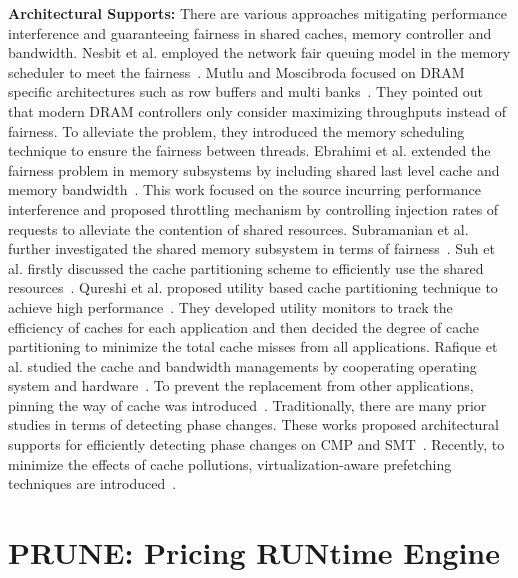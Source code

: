 \documentclass{sig-alternate}
\begin{document}
{\bf Architectural Supports: } 
There are various approaches mitigating performance interference and guaranteeing fairness in shared caches, memory controller and bandwidth. 
Nesbit et al. employed the network fair queuing model in the memory scheduler to meet the fairness~\cite{Nesbit:2006:FQM}. Mutlu and Moscibroda focused on DRAM specific architectures such as row buffers and multi banks~\cite{stfm}. They pointed out that modern DRAM controllers only consider maximizing throughputs instead of fairness. To alleviate the problem, they introduced the memory scheduling technique to ensure the fairness between threads. Ebrahimi et al. extended the fairness problem in memory subsystems by including shared last level cache and memory bandwidth~\cite{fst}. This work focused on the source incurring performance interference and proposed throttling mechanism by controlling injection rates of requests to alleviate the contention of shared resources. Subramanian et al. further investigated the shared memory subsystem in terms of fairness~\cite{6522356}.
Suh et al. firstly discussed the cache partitioning scheme to efficiently use the shared resources~\cite{Suh:2002:NMM:874076.876484}. Qureshi et al. proposed utility based cache partitioning technique to achieve high performance~\cite{Qureshi:2006:UCP:1194816.1194855}. They developed utility monitors to track the efficiency of caches for each application and then decided the degree of cache partitioning to minimize the total cache misses from all applications. Rafique et al. studied the cache and bandwidth managements by cooperating operating system and hardware~\cite{Rafique:2006:ASO:1152154.1152160,Rafique:2007:EMD:1299042.1299052 }. To prevent the replacement from other applications, pinning the way of cache was introduced~\cite{Srikantaiah:2008:ASP:1346281.1346299}. 
Traditionally, there are many prior studies in terms of detecting phase changes.  These works proposed architectural supports for efficiently detecting phase changes on CMP and SMT~\cite{Dhodapkar:2003:CPP:956417.956539, Luque:2009:CAC:1591872.1591935, Luque:2009:IIC:1636712.1637756, 5989796, Luque:2013:FCT:2400682.2400709, Sherwood:2003:PTP:859618.859657, Lau:2005:TPC:1042442.1043427, Eyerman:2009:PCA:1508244.1508260}. 
Recently, to minimize the effects of cache pollutions, virtualization-aware prefetching techniques are introduced~\cite{Daly,ReCap,Ahn:2014:MVP:2742155.2742195}.
\section{PRUNE: Pricing RUNtime Engine}
\label{sec:PRUNE:PricingRUNtimeEngine}
\end{document}

